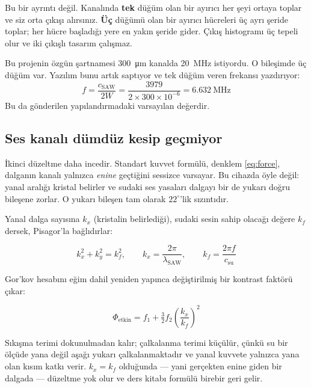 \documentclass[11pt,a4paper]{article}
\begin{document}
\begin{warnbox}
Bu bir ayrıntı değil. Kanalında \textbf{tek} düğüm olan bir ayırıcı her şeyi
ortaya toplar ve siz orta çıkışı alırsınız. \textbf{Üç} düğümü olan bir ayırıcı
hücreleri üç ayrı şeride toplar; her hücre başladığı yere en yakın şeride
gider. Çıkış histogramı üç tepeli olur ve iki çıkışlı tasarım çalışmaz.

Bu projenin özgün şartnamesi \SI{300}{\micro\meter} kanalda
\SI{20}{\mega\hertz} istiyordu. O bileşimde üç düğüm var. Yazılım bunu artık
saptıyor ve tek düğüm veren frekansı yazdırıyor:
\[
f = \frac{c_{\text{SAW}}}{2W} = \frac{3979}{2\times300\times10^{-6}}
  = \SI{6,632}{\mega\hertz}
\]
Bu da gönderilen yapılandırmadaki varsayılan değerdir.
\end{warnbox}

\subsection{Ses kanalı dümdüz kesip geçmiyor}

İkinci düzeltme daha incedir. Standart kuvvet formülü, denklem
\eqref{eq:force}, dalganın kanalı yalnızca \emph{enine} geçtiğini sessizce
varsayar. Bu cihazda öyle değil: yanal aralığı kristal belirler ve sudaki ses
yasaları dalgayı bir de yukarı doğru bileşene zorlar. O yukarı bileşen tam
olarak $22^\circ$'lik sızıntıdır.

Yanal dalga sayısına $k_x$ (kristalin belirlediği), sudaki sesin sahip olacağı
değere $k_f$ dersek, Pisagor'la bağlıdırlar:

\begin{equation}
k_x^2 + k_y^2 = k_f^2,
\qquad k_x = \frac{2\pi}{\lambda_{\text{SAW}}},
\qquad k_f = \frac{2\pi f}{c_{\text{su}}}
\end{equation}

Gor'kov hesabını eğim dahil yeniden yapınca değiştirilmiş bir kontrast faktörü
çıkar:

\begin{equation}
\boxed{\;\Phi_{\text{etkin}} = f_1 + \tfrac{3}{2}f_2\left(\frac{k_x}{k_f}\right)^{\!2}\;}
\label{eq:phieff}
\end{equation}

Sıkışma terimi dokunulmadan kalır; çalkalanma terimi küçülür, çünkü su bir
ölçüde yana değil aşağı yukarı çalkalanmaktadır ve yanal kuvvete yalnızca yana
olan kısım katkı verir. $k_x = k_f$ olduğunda --- yani gerçekten enine giden bir
dalgada --- düzeltme yok olur ve ders kitabı formülü birebir geri gelir.
\end{document}
